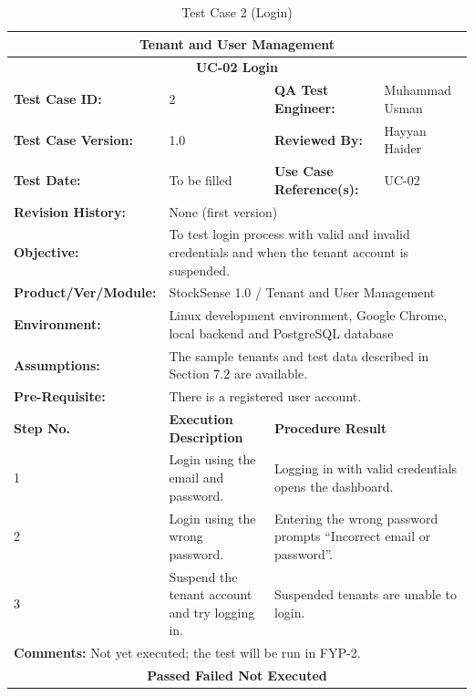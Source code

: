 \documentclass{StockSense}
\begin{document}
\begin{table}[!htbp]
\centering
\caption{Test Case 2 (Login)}
{\small\linespread{1}\selectfont
\begin{tabular}{|p{}|p{}|p{}|p{}|}
\hline
\multicolumn{4}{|c|}{\textbf{Tenant and User Management}} \\ \hline
\multicolumn{4}{|c|}{\textbf{UC-02 Login}} \\ \hline
\textbf{Test Case ID:} & 2 & \textbf{QA Test Engineer:} & Muhammad Usman \\ \hline
\textbf{Test Case Version:} & 1.0 & \textbf{Reviewed By:} & Hayyan Haider \\ \hline
\textbf{Test Date:} & To be filled & \textbf{Use Case Reference(s):} & UC-02 \\ \hline
\textbf{Revision History:} & \multicolumn{3}{p{\dimexpr0.70\textwidth+4\tabcolsep\relax}|}{None (first version)} \\ \hline
\textbf{Objective:} & \multicolumn{3}{p{\dimexpr0.70\textwidth+4\tabcolsep\relax}|}{To test login process with valid and invalid credentials and when the tenant account is suspended.} \\ \hline
\textbf{Product/Ver/Module:} & \multicolumn{3}{p{\dimexpr0.70\textwidth+4\tabcolsep\relax}|}{StockSense 1.0 / Tenant and User Management} \\ \hline
\textbf{Environment:} & \multicolumn{3}{p{\dimexpr0.70\textwidth+4\tabcolsep\relax}|}{Linux development environment, Google Chrome, local backend and PostgreSQL database} \\ \hline
\textbf{Assumptions:} & \multicolumn{3}{p{\dimexpr0.70\textwidth+4\tabcolsep\relax}|}{The sample tenants and test data described in Section 7.2 are available.} \\ \hline
\textbf{Pre-Requisite:} & \multicolumn{3}{p{\dimexpr0.70\textwidth+4\tabcolsep\relax}|}{There is a registered user account.} \\ \hline
\textbf{Step No.} & \textbf{Execution Description} & \multicolumn{2}{l|}{\textbf{Procedure Result}} \\ \hline
1 & Login using the email and password. & \multicolumn{2}{p{\dimexpr0.42\textwidth+2\tabcolsep\relax}|}{Logging in with valid credentials opens the dashboard.} \\ \hline
2 & Login using the wrong password. & \multicolumn{2}{p{\dimexpr0.42\textwidth+2\tabcolsep\relax}|}{Entering the wrong password prompts ``Incorrect email or password''.} \\ \hline
3 & Suspend the tenant account and try logging in. & \multicolumn{2}{p{\dimexpr0.42\textwidth+2\tabcolsep\relax}|}{Suspended tenants are unable to login.} \\ \hline
\multicolumn{4}{|l|}{\textbf{Comments:} Not yet executed; the test will be run in FYP-2.} \\ \hline
\multicolumn{4}{|c|}{\textbf{Passed \quad Failed \quad Not Executed}} \\ \hline
\end{tabular}\par}
\end{table}
\end{document}

